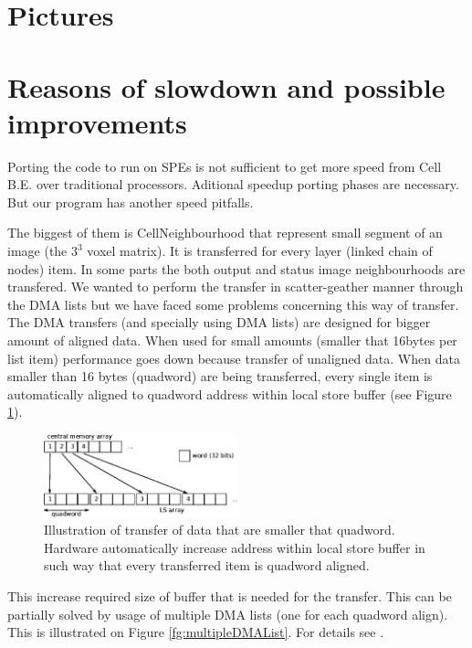 \section{Pictures}

\section{Reasons of slowdown and possible improvements}

\par
Porting the code to run on SPEs is not sufficient to get more speed from Cell B.E. over traditional processors.
Aditional speedup porting phases are necessary.
But our program has another speed pitfalls.

\par
The biggest of them is CellNeighbourhood that represent small segment of an image (the $3^3$ voxel matrix).
It is transferred for every layer (linked chain of nodes) item.
In some parts the both output and status image neighbourhoods are transfered.
We wanted to perform the transfer in scatter-geather manner through the DMA lists but we have faced some problems concerning this way of transfer.
The DMA transfers (and specially using DMA lists) are designed for bigger amount of aligned data.
When used for small amounts (smaller that 16bytes per list item) performance goes down because transfer of unaligned data.
When data smaller than 16 bytes (quadword) are being transferred, every single item is automatically aligned to quadword address within local store buffer (see Figure \ref{fg:automaticAlignOfSmallData}).

\begin{figure}
    \centering
    \includegraphics[width=0.5\textwidth]{data/automaticAlignOfSmallData}
    \caption[automatic align of small data]
{
  Illustration of transfer of data that are smaller that quadword.
  Hardware automatically increase address within local store buffer in such way that every transferred item is quadword aligned.
}
    \label{fg:automaticAlignOfSmallData}
\end{figure}

This increase required size of buffer that is needed for the transfer.
This can be partially solved by usage of multiple DMA lists (one for each quadword align).
This is illustrated on Figure \ref{fg:multipleDMAList}.
For details see \cite{DMAListIssues}.

